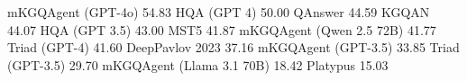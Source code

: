 mKGQAgent (GPT-4o)	54.83
HQA (GPT 4)	50.00
QAnswer	44.59
KGQAN	44.07
HQA (GPT 3.5)	43.00
MST5	41.87
mKGQAgent (Qwen 2.5 72B)	41.77
Triad (GPT-4)	41.60
DeepPavlov 2023	37.16
mKGQAgent (GPT-3.5)	33.85
Triad (GPT-3.5)	29.70
mKGQAgent (Llama 3.1 70B)	18.42
Platypus	15.03